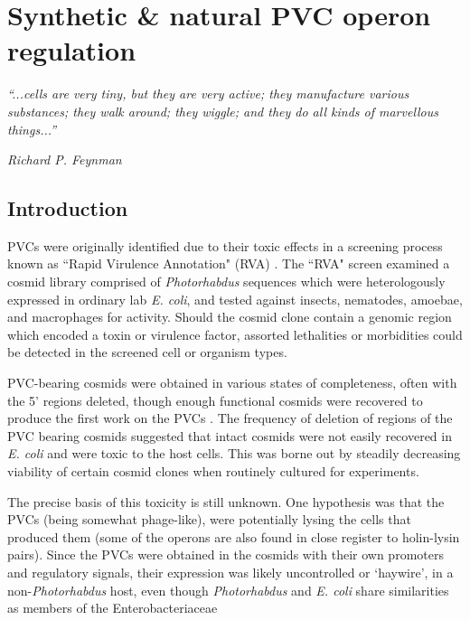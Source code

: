 \pagestyle{IHA-fancy-style}


\chapter{Synthetic \& natural PVC operon regulation}\label{regulation}

\epigraph{\emph{``...cells are very tiny, but they are very active; they manufacture various substances; they walk around; they wiggle; and they do all kinds of marvellous things...''}}{\textit{Richard P. Feynman}}

\section{Introduction}
PVCs were originally identified due to their toxic effects in a screening process known as ``Rapid Virulence Annotation" (RVA) \citep{Waterfield2008, Yang2006}. The ``RVA" screen examined a cosmid library comprised of \emph{Photorhabdus} sequences which were heterologously expressed in ordinary lab \emph{E. coli}, and tested against insects, nematodes, amoebae, and macrophages for activity. Should the cosmid clone contain a genomic region which encoded a toxin or virulence factor, assorted lethalities or morbidities could be detected in the screened cell or organism types.

PVC-bearing cosmids were obtained in various states of completeness, often with the 5' regions deleted, though enough functional cosmids were recovered to produce the first work on the PVCs \citep{Yang2006}. The frequency of deletion of regions of the PVC bearing cosmids suggested that intact cosmids were not easily recovered in \emph{E. coli} and were toxic to the host cells. This was borne out by steadily decreasing viability of certain cosmid clones when routinely cultured for experiments.

The precise basis of this toxicity is still unknown. One hypothesis was that the PVCs (being somewhat phage-like), were potentially lysing the cells that produced them (some of the operons are also found in close register to holin-lysin pairs). Since the PVCs were obtained in the cosmids with their own promoters and regulatory signals, their expression was likely uncontrolled or `haywire', in a non-\emph{Photorhabdus} host, even though \emph{Photorhabdus} and \emph{E. coli} share similarities as members of the Enterobacteriaceae

